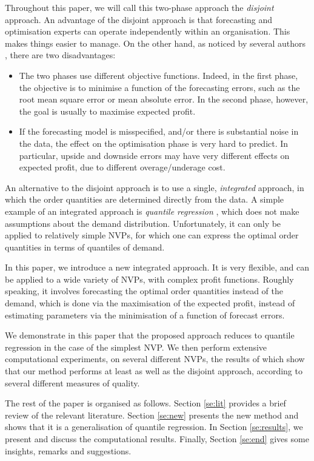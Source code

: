 \documentclass{article}
\begin{document}
Throughout this paper, we will call this two-phase approach the \emph{disjoint} approach. An advantage of the disjoint approach is that forecasting and optimisation experts can operate independently within an organisation. This makes things easier to manage. On the other hand, as noticed by several authors \cite{BT06,BM12,Ka94,KT96,KTB20}, there are two disadvantages:
\begin{itemize}
\item The two phases use different objective functions. Indeed, in the first phase, the objective is to minimise a function of the forecasting errors, such as the root mean square error or mean absolute error. In the second phase, however, the goal is usually to maximise expected profit.
\item If the forecasting model is misspecified, and/or there is substantial noise in the data, the effect on the optimisation phase is very hard to predict. In particular, upside and downside errors may have very different effects on expected profit, due to different overage/underage cost.
\end{itemize}

An alternative to the disjoint approach is to use a single, \textit{integrated} approach, in which the order quantities are determined directly from the data. A simple example of an integrated approach is \emph{quantile regression} \cite{Br16,Hu19}, which does not make assumptions about the demand distribution. Unfortunately, it can only be applied to relatively simple NVPs, for which one can express the optimal order quantities in terms of quantiles of demand.

In this paper, we introduce a new integrated approach. It is very flexible, and can be applied to a wide variety of NVPs, with complex profit functions. Roughly speaking, it involves forecasting the optimal order quantities instead of the demand, which is done via the maximisation of the expected profit, instead of estimating parameters via the minimisation of a function of forecast errors.

We demonstrate in this paper that the proposed approach reduces to quantile regression in the case of the simplest NVP. We then perform extensive computational experiments, on several different NVPs, the results of which show that our method performs at least as well as the disjoint approach, according to several different measures of quality.

The rest of the paper is organised as follows. Section \ref{se:lit} provides a brief review of the relevant literature. Section \ref{se:new} presents the new method and shows that it is a generalisation of quantile regression. In Section \ref{se:results}, we present and discuss the computational results. Finally, Section \ref{se:end} gives some insights, remarks and suggestions.
\end{document}

